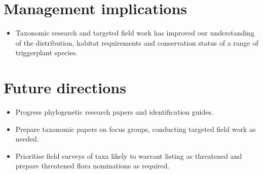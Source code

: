 \documentclass[version=last,
    paper=a4, %
    10pt, %
    usenames,
    dvipsnames,
    oneside, %
    headings=openany, %
    DIV=15 %
]{scrbook}
\begin{document}
\section*{Management implications}
\begin{itemize}
\itemsep1pt\parskip0pt
\item
  Taxonomic research and targeted field work has improved our
  understanding of the distribution, habitat requirements and
  conservation status of a range of triggerplant species.
\end{itemize}



\section*{Future directions}
\begin{itemize}
\itemsep1pt\parskip0pt
\item
  Progress phylogenetic research papers and identification guides.
\item
  Prepare taxonomic papers on focus groups, conducting targeted field
  work as needed.
\item
  Prioritise field surveys of taxa likely to warrant listing as
  threatened and prepare threatened flora nominations as required.
\end{itemize}



\end{document}
